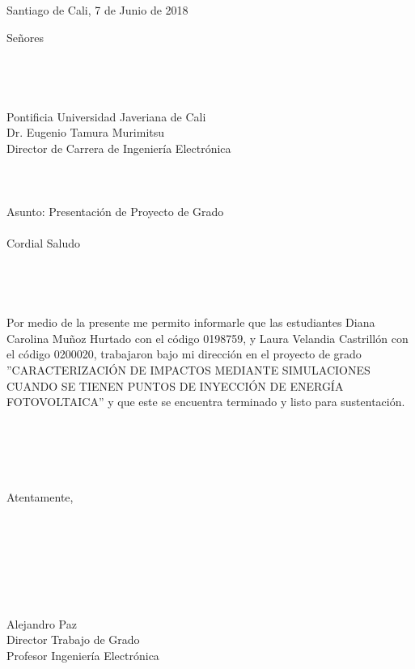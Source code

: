 \begin{flushright}
Santiago de Cali, 7 de Junio de 2018
\end{flushright}
Señores\\
\\
\\
\\
\\
Pontificia Universidad Javeriana de Cali\\
Dr. Eugenio Tamura Murimitsu\\
Director de Carrera de Ingeniería Electrónica\\\\
\\
\\
Asunto: Presentación de Proyecto de Grado\\
\\
Cordial Saludo\\\\
\\
\\
\\
Por medio de la presente me permito informarle que las estudiantes Diana Carolina Muñoz Hurtado con el código 0198759, y Laura Velandia Castrillón con el código 0200020, trabajaron bajo mi dirección en el proyecto de grado ''CARACTERIZACIÓN DE IMPACTOS MEDIANTE SIMULACIONES CUANDO SE TIENEN PUNTOS DE INYECCIÓN DE ENERGÍA FOTOVOLTAICA'' y que este se encuentra terminado y listo para sustentación.\\
\\
\\
\\
\\
\\
Atentamente,\\\\\\
\\
\\
\\
\\
\\
Alejandro Paz\\
Director Trabajo de Grado\\
Profesor Ingeniería Electrónica
\newpage